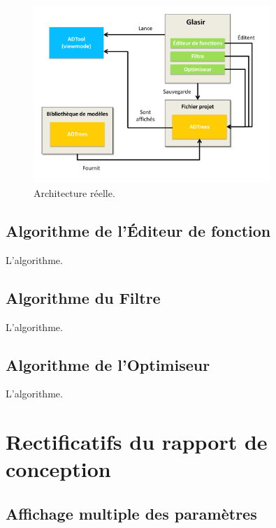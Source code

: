         
        \begin{figure}[H]
            \centering
                \includegraphics[width=0.8\textwidth]{figure/archiReelle.pdf}
            \caption{Architecture réelle.}
            \label{fig:archiReelle}
        \end{figure}
        
        
\subsection{Algorithme de l'Éditeur de fonction}
	L'algorithme.

\subsection{Algorithme du Filtre}
 	L'algorithme.

\subsection{Algorithme de l'Optimiseur}
	L'algorithme.
        

\newpage
\section{Rectificatifs du rapport de conception}
\label{sec:rectConc}


	\subsection{Affichage multiple des paramètres}


